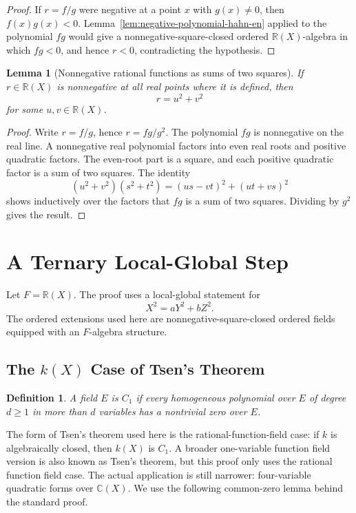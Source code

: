 \documentclass[uplatex,dvipdfmx]{jsarticle}
\newcommand{\Frac}{\mathbb{R}(X)}
\theoremstyle{matrixsosdefinition}
\newtheorem{lemma}[theorem]{Lemma}
\newtheorem{definition}[theorem]{Definition}
\begin{document}
\begin{proof}
  If \(r=f/g\) were negative at a point \(x\) with \(g(x)\ne0\), then
  \(f(x)g(x)<0\). Lemma~\ref{lem:negative-polynomial-hahn-en} applied to the
  polynomial \(fg\) would give a nonnegative-square-closed ordered
  \(\Frac\)-algebra in which \(fg<0\), and hence
  \(r<0\), contradicting the hypothesis.
\end{proof}

\begin{lemma}[Nonnegative rational functions as sums of two squares]
\label{lem:nonneg-rational-function-sum-two-squares-en}
  If \(r\in\Frac\) is nonnegative at all real points where it is defined, then
  \[
    r=u^2+v^2
  \]
  for some \(u,v\in\Frac\).
\end{lemma}

\begin{proof}
  Write \(r=f/g\), hence \(r=fg/g^2\). The polynomial \(fg\) is nonnegative on
  the real line. A nonnegative real polynomial factors into even real roots and
  positive quadratic factors. The even-root part is a square, and each positive
  quadratic factor is a sum of two squares. The identity
  \[
    (u^2+v^2)(s^2+t^2)=(us-vt)^2+(ut+vs)^2
  \]
  shows inductively over the factors that \(fg\) is a sum of two squares.
  Dividing by \(g^2\) gives the result.
\end{proof}

\section{A Ternary Local-Global Step}\label{sec:ternary-local-global-en}

Let \(F=\Frac\). The proof uses a local-global statement for
\[
  X^2=aY^2+bZ^2.
\]
The ordered extensions used here are nonnegative-square-closed ordered fields
equipped with an \(F\)-algebra structure.

\subsection{\texorpdfstring{The \(k(X)\) Case of Tsen's Theorem}{The k(X) Case of Tsen's Theorem}}

\begin{definition}
  A field \(E\) is \(C_1\) if every homogeneous polynomial over \(E\) of
  degree \(d\ge1\) in more than \(d\) variables has a nontrivial zero over
  \(E\).
\end{definition}

The form of Tsen's theorem used here is the rational-function-field case: if \(k\) is
algebraically closed, then \(k(X)\) is \(C_1\).  A broader one-variable function
field version is also known as Tsen's theorem, but this proof only uses the
rational function field case.  The actual application is still narrower:
four-variable quadratic forms over \(\mathbb{C}(X)\).  We use the following
common-zero lemma behind the standard proof.
\end{document}
